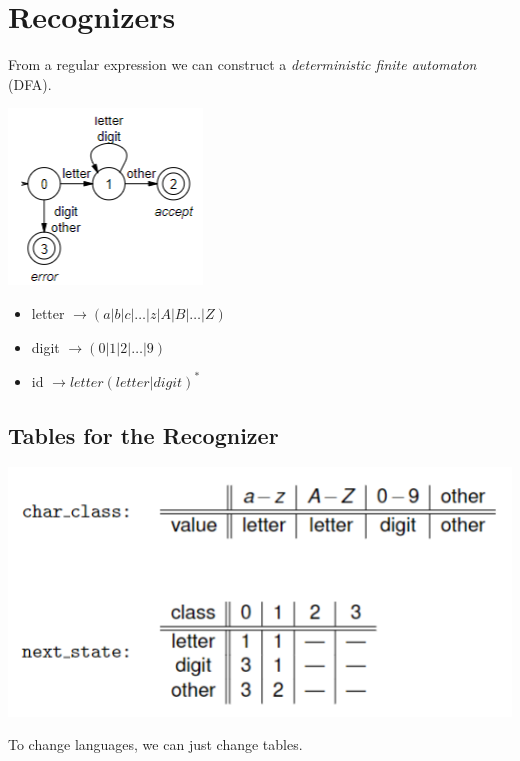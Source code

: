 \documentclass[10pt]{article}
\begin{document}
\section*{Recognizers}
From a regular expression we can construct a \textit{deterministic finite automaton} (DFA).
\begin{center}
    \includegraphics*[scale=1]{W1_8.png}
\end{center}
\begin{itemize}
    \item letter $\rightarrow (a \vert b \vert c \vert \dots \vert z \vert A \vert B \vert \dots \vert Z)$
    \item digit $\rightarrow (0 \vert 1 \vert 2 \vert \dots \vert 9)$
    \item id $\rightarrow letter ( letter \vert digit)^*$
\end{itemize}

\subsection*{Tables for the Recognizer}
\begin{center}
    \includegraphics*[scale=1]{W1_9.png}
\end{center}
To change languages, we can just change tables.
\end{document}
